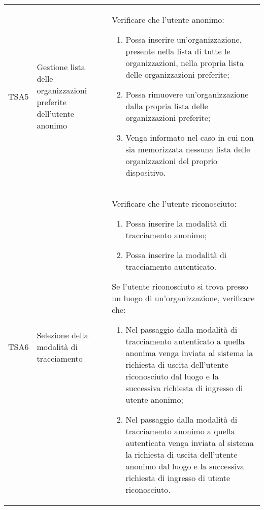 {\begin{longtable}{ c  C{3cm}  C{11cm} }
TSA5 & Gestione lista delle organizzazioni preferite dell'utente anonimo &
Verificare che l'utente anonimo:
\begin{enumerate}
    \item Possa inserire un'organizzazione, presente nella lista di tutte le organizzazioni, nella propria lista delle organizzazioni preferite;
    \item Possa rimuovere un'organizzazione dalla propria lista delle organizzazioni preferite;
    \item Venga informato nel caso in cui non sia memorizzata nessuna lista delle organizzazioni del proprio dispositivo.
\end{enumerate} \\

TSA6 & Selezione della modalità di tracciamento & 
Verificare che l'utente riconosciuto:
\begin{enumerate}
    \item Possa inserire la modalità di tracciamento anonimo;
    \item Possa inserire la modalità di tracciamento autenticato.
\end{enumerate}
Se l'utente riconosciuto si trova presso un luogo di un'organizzazione, verificare che:
\begin{enumerate}
    \item Nel passaggio dalla modalità di tracciamento autenticato a quella anonima venga inviata al sistema la richiesta di uscita dell'utente riconosciuto dal luogo e la successiva richiesta di ingresso di utente anonimo;
    \item Nel passaggio dalla modalità di tracciamento anonimo a quella autenticata venga inviata al sistema la richiesta di uscita dell'utente anonimo dal luogo e la successiva richiesta di ingresso di utente riconosciuto.
\end{enumerate} \\


\end{longtable}}
